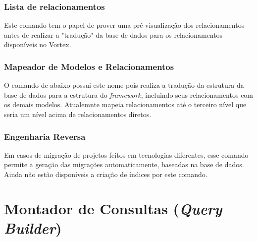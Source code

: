 \spaceH{}

\label{scripts/cosmo_db_display.bash}

\subsubsection{Lista de relacionamentos}

Este comando tem o papel de prover uma pré-visualização dos relacionamentos antes de realizar a "tradução" da base de dados para os relacionamentos disponíveis no Vortex. 

\spaceH{}

\label{scripts/cosmo_db_relationships.bash}

\subsubsection{Mapeador de Modelos e Relacionamentos}
\label{translate_relations}

O comando de abaixo possui este nome pois realiza a tradução da estrutura da base de dados para a estrutura do \textit{framework}, incluindo seus relacionamentos com os demais modelos. Atualemnte mapeia relacionamentos até o terceiro nível que seria um nível acima de relacionamentos diretos.

\spaceH{}

\label{scripts/cosmo_db_translate.bash}

\subsubsection{Engenharia Reversa}

Em casos de migração de projetos feitos em tecnologias diferentes, esse comando permite a geração das migrações automaticamente, baseadas na base de dados. Ainda não estão disponíveis a criação de índices por este comando.

\spaceH{}

\label{scripts/cosmo_db_reverse.bash}

\section{Montador de Consultas (\textit{Query Builder})}
\label{QueryBuilder}

